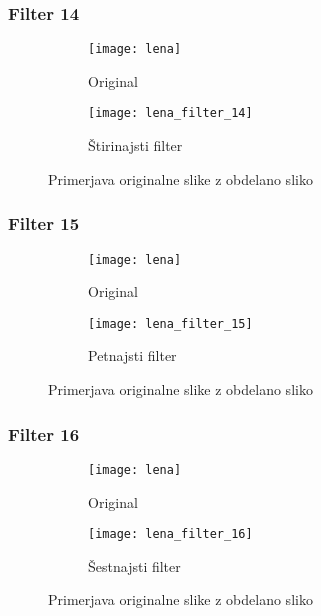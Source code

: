 \subsubsection*{Filter 14}
\begin{figure}[h]
    \centering
    \begin{subfigure}[b]{0.4\textwidth}
        \texttt{[image: lena]}
        \caption{Original}
    \end{subfigure}
    \begin{subfigure}[b]{0.4\textwidth}
        \texttt{[image: lena\_filter\_14]}
        \caption{Štirinajsti filter}
    \end{subfigure}
    \caption{Primerjava originalne slike z obdelano sliko}
    \label{fig:lena_filter_14}
\end{figure}


\subsubsection*{Filter 15}
\begin{figure}[h]
    \centering
    \begin{subfigure}[b]{0.4\textwidth}
        \texttt{[image: lena]}
        \caption{Original}
    \end{subfigure}
    \begin{subfigure}[b]{0.4\textwidth}
        \texttt{[image: lena\_filter\_15]}
        \caption{Petnajsti filter}
    \end{subfigure}
    \caption{Primerjava originalne slike z obdelano sliko}
    \label{fig:lena_filter_15}
\end{figure}


\subsubsection*{Filter 16}
\begin{figure}[h]
    \centering
    \begin{subfigure}[b]{0.4\textwidth}
        \texttt{[image: lena]}
        \caption{Original}
    \end{subfigure}
    \begin{subfigure}[b]{0.4\textwidth}
        \texttt{[image: lena\_filter\_16]}
        \caption{Šestnajsti filter}
    \end{subfigure}
    \caption{Primerjava originalne slike z obdelano sliko}
    \label{fig:lena_filter_16}
\end{figure}


